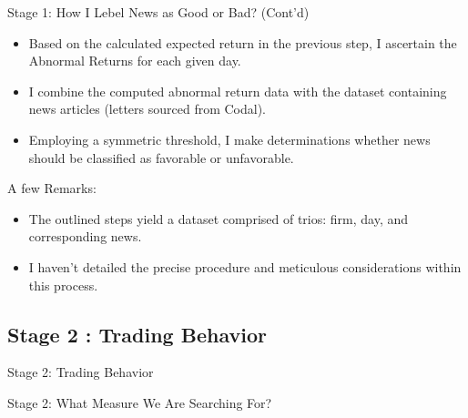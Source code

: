 \documentclass{beamer}
\begin{document}
\begin{frame}{Stage 1: How I Lebel News as Good or Bad? (Cont'd)}
    \begin{itemize}
        \item Based on the calculated expected return in the previous step, I ascertain the Abnormal Returns for each given day.
        \item I combine the computed abnormal return data with the dataset containing news articles (letters sourced from Codal).
        \item Employing a symmetric threshold, I make determinations whether news should be classified as favorable or unfavorable.
    \end{itemize}

    A few Remarks:
    \begin{itemize}
        \item The outlined steps yield a dataset comprised of trios: firm, day, and corresponding news.
        \item I haven't detailed the precise procedure and meticulous considerations within this process.
    \end{itemize}

\end{frame}


\subsection{Stage 2 : Trading Behavior}



\begin{frame}
    \Huge
    \center
    Stage 2: Trading Behavior
\end{frame}


\begin{frame}{Stage 2: What Measure We Are Searching For?}


\end{frame}
\end{document}
